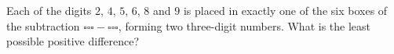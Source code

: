 Each of the digits $2$, $4$, $5$, $6$, $8$ and $9$ is placed in exactly one of the six boxes of the subtraction $\square\square\square-\square\square\square$, forming two three-digit numbers. What is the least possible positive difference?
